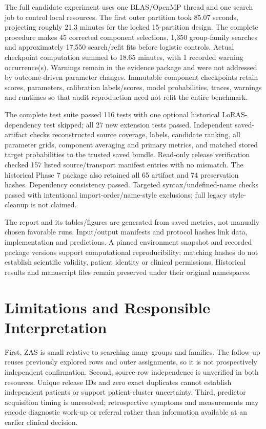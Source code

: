 \documentclass[conference]{IEEEtran}
\begin{document}
The full candidate experiment uses one BLAS/OpenMP thread and one search job to control local resources. The first outer partition took 85.07 seconds, projecting roughly 21.3 minutes for the locked 15-partition design. The complete procedure makes 45 corrected component selections, 1,350 group-family searches and approximately 17,550 search/refit fits before logistic controls. Actual checkpoint computation summed to 18.65 minutes, with 1 recorded warning occurrence(s). Warnings remain in the evidence package and were not addressed by outcome-driven parameter changes. Immutable component checkpoints retain scores, parameters, calibration labels/scores, model probabilities, traces, warnings and runtimes so that audit reproduction need not refit the entire benchmark.

The complete test suite passed 116 tests with one optional historical LoRAS-dependency test skipped; all 27 new extension tests passed. Independent saved-artifact checks reconstructed source coverage, labels, candidate ranking, all parameter grids, component averaging and primary metrics, and matched stored target probabilities to the trusted saved bundle. Read-only release verification checked 157 listed source/transport manifest entries with no mismatch. The historical Phase 7 package also retained all 65 artifact and 74 preservation hashes. Dependency consistency passed. Targeted syntax/undefined-name checks passed with intentional import-order/name-style exclusions; full legacy style-cleanup is not claimed.

The report and its tables/figures are generated from saved metrics, not manually chosen favorable runs. Input/output manifests and protocol hashes link data, implementation and predictions. A pinned environment snapshot and recorded package versions support computational reproducibility; matching hashes do not establish scientific validity, patient identity or clinical permissions. Historical results and manuscript files remain preserved under their original namespaces.

\section{Limitations and Responsible Interpretation}
First, ZAS is small relative to searching many groups and families. The follow-up reuses previously explored rows and outer assignments, so it is not prospectively independent confirmation. Second, source-row independence is unverified in both resources. Unique release IDs and zero exact duplicates cannot establish independent patients or support patient-cluster uncertainty. Third, predictor acquisition timing is unresolved; retrospective symptoms and measurements may encode diagnostic work-up or referral rather than information available at an earlier clinical decision.
\end{document}
